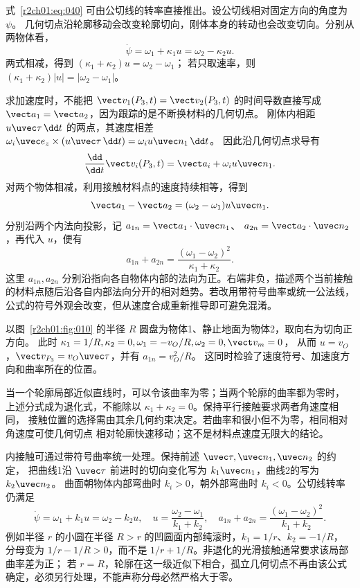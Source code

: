 式~\eqref{r2ch01:eq:040} 可由公切线的转率直接推出。设公切线相对固定方向的角度为 $\psi$。
几何切点沿轮廓移动会改变轮廓切向，刚体本身的转动也会改变切向。分别从两物体看，
\[
 \dot\psi=\omega_1+\kappa_1u
          =\omega_2-\kappa_2u.
\]
两式相减，得到 $(\kappa_1+\kappa_2)u=\omega_2-\omega_1$；
若只取速率，则 $(\kappa_1+\kappa_2)|u|=|\omega_2-\omega_1|$。

求加速度时，不能把 $\vect v_1(P_3,t)=\vect v_2(P_3,t)$ 的时间导数直接写成
$\vect a_1=\vect a_2$，因为跟踪的是不断换材料的几何切点。
刚体内相距 $u\uvec\tau\,\dd t$ 的两点，其速度相差
$\omega_i\uvec e_z\times(u\uvec\tau\,\dd t)=\omega_i u\uvec n_1\,\dd t$。
因此沿几何切点求导有
\[
 \frac{\dd}{\dd t}\vect v_i(P_3,t)=\vect a_i+\omega_i u\uvec n_1.
\]
对两个物体相减，利用接触材料点的速度持续相等，得到
\[
 \vect a_1-\vect a_2=(\omega_2-\omega_1)u\uvec n_1.
\]
分别沿两个内法向投影，记 $a_{1n}=\vect a_1\cdot\uvec n_1$、
$a_{2n}=\vect a_2\cdot\uvec n_2$，再代入 $u$，便有
\begin{equation}
  \boxed{a_{1n}+a_{2n}
  =\frac{(\omega_1-\omega_2)^2}{\kappa_1+\kappa_2}}.
  \label{r2ch01:eq:041}
\end{equation}
这里 $a_{1n},a_{2n}$ 分别沿指向各自物体内部的法向为正。右端非负，描述两个当前接触的材料点随后沿各自内部法向分开的相对趋势。若改用带符号曲率或统一公法线，公式的符号外观会改变，但从速度合成重新推导即可避免混淆。

以图~\ref{r2ch01:fig:010} 的半径 $R$ 圆盘为物体1、静止地面为物体2，取向右为切向正方向。
此时 $\kappa_1=1/R,\kappa_2=0,\omega_1=-v_O/R,\omega_2=0,\vect v_m=0$，
从而 $u=v_O$，$\vect v_{P_3}=v_O\uvec\tau$，并有 $a_{1n}=v_O^2/R$。
这同时检验了速度符号、加速度方向和曲率所在的位置。

当一个轮廓局部近似直线时，可以令该曲率为零；当两个轮廓的曲率都为零时，
上述分式成为退化式，不能除以 $\kappa_1+\kappa_2=0$。保持平行接触要求两者角速度相同，
接触位置的选择需由其余几何约束决定。若曲率和很小但不为零，相同相对角速度可使几何切点
相对轮廓快速移动；这不是材料点速度无限大的结论。

内接触可通过带符号曲率统一处理。保持前述 $\uvec\tau,\uvec n_1,\uvec n_2$ 的约定，
把曲线1沿 $\uvec\tau$ 前进时的切向变化写为 $k_1\uvec n_1$，曲线2的写为 $k_2\uvec n_2$。
曲面朝物体内部弯曲时 $k_i>0$，朝外部弯曲时 $k_i<0$。公切线转率仍满足
\[
 \dot\psi=\omega_1+k_1u=\omega_2-k_2u,
 \quad
 u=\frac{\omega_2-\omega_1}{k_1+k_2},
 \quad
 a_{1n}+a_{2n}=\frac{(\omega_1-\omega_2)^2}{k_1+k_2}.
\]
例如半径 $r$ 的小圆在半径 $R>r$ 的凹圆面内部纯滚时，$k_1=1/r$、$k_2=-1/R$，
分母变为 $1/r-1/R>0$，而不是 $1/r+1/R$。非退化的光滑接触通常要求该局部曲率差为正；
若 $r=R$，轮廓在这一级近似下相合，孤立几何切点不再由该公式确定，必须另行处理，不能声称分母必然严格大于零。

